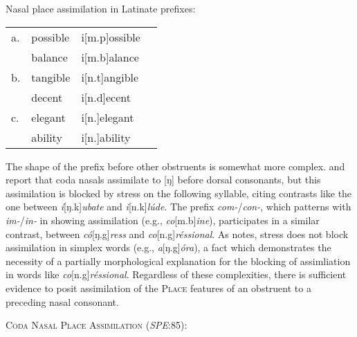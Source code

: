 \ex Nasal place assimilation in Latinate prefixes: \\
\begin{tabular}{l l l l}
a. & possible & i[m.p]ossible \\
   & balance  & i[m.b]alance  \\
b. & tangible & i[n.t]angible \\
   & decent   & i[n.d]ecent   \\
c. & elegant  & i[n.]elegant  \\
   & ability  & i[n.]ability  \\
\end{tabular} 
\xe

\noindent
The shape of the prefix before other obstruents is somewhat more complex. 
\citet[][62]{Halle1985a} and \citet[][90]{Borowsky1986} report that coda nasals assimilate to [ŋ] before dorsal consonants, but this assimilation is blocked by stress on the following syllable, citing contrasts like the one between \emph{í}[ŋ.k]\emph{ubate} and \emph{i}[n.k]\emph{lúde}. The prefix \emph{com-}/\emph{con-}, which patterns with \emph{im-}/\emph{in-} in showing assimilation (e.g., \emph{co}[m.b]\emph{ine}), participates in a similar contrast, between \emph{có}[ŋ.g]\emph{ress} and \emph{co}[n.g]\emph{réssional}. As \citeauthor{Borowsky1986} notes, stress does not block assimilation in simplex words (e.g., \emph{a}[ŋ.g]\emph{óra}), a fact which demonstrates the necessity of a partially morphological explanation for the blocking of assimliation in words like \emph{co}[n.g]\emph{réssional}. Regardless of these complexities, there is sufficient evidence to posit assimilation of the \textsc{Place} features of an obstruent to a preceding nasal consonant. 

\ex \textsc{Coda Nasal Place Assimilation} (\emph{SPE}:85): \\
\label{CNPA}
\xe

